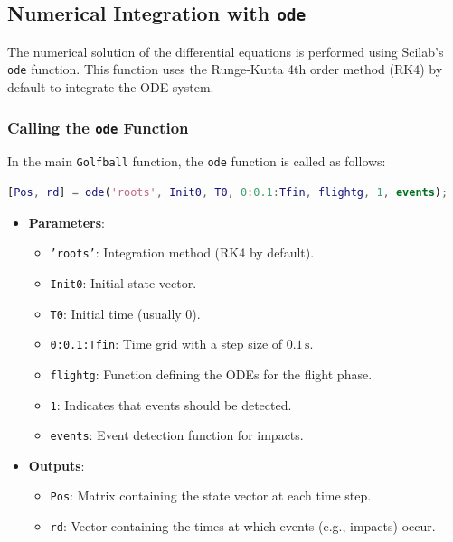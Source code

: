 \documentclass[10pt,a4paper]{report}
\begin{document}
\bigskip
\subsection{Numerical Integration with \texttt{ode}}
\label{subsec:numerical_integration}

The numerical solution of the differential equations is performed using Scilab's \texttt{ode} function. This function uses the Runge-Kutta 4th order method (RK4) by default to integrate the ODE system.

\subsubsection{Calling the \texttt{ode} Function}
In the main \texttt{Golfball} function, the \texttt{ode} function is called as follows:

\begin{lstlisting}[language=Matlab, caption={Calling the \texttt{ode} function for the flight phase}, label=lst:ode_call]
[Pos, rd] = ode('roots', Init0, T0, 0:0.1:Tfin, flightg, 1, events);
\end{lstlisting}

\begin{itemize}
    \item \textbf{Parameters}:
    \begin{itemize}
        \item \texttt{'roots'}: Integration method (RK4 by default).
        \item \texttt{Init0}: Initial state vector.
        \item \texttt{T0}: Initial time (usually \(0\)).
        \item \texttt{0:0.1:Tfin}: Time grid with a step size of \(0.1 \, \text{s}\).
        \item \texttt{flightg}: Function defining the ODEs for the flight phase.
        \item \texttt{1}: Indicates that events should be detected.
        \item \texttt{events}: Event detection function for impacts.
    \end{itemize}
    \item \textbf{Outputs}:
    \begin{itemize}
        \item \texttt{Pos}: Matrix containing the state vector at each time step.
        \item \texttt{rd}: Vector containing the times at which events (e.g., impacts) occur.
    \end{itemize}
\end{itemize}
\end{document}
